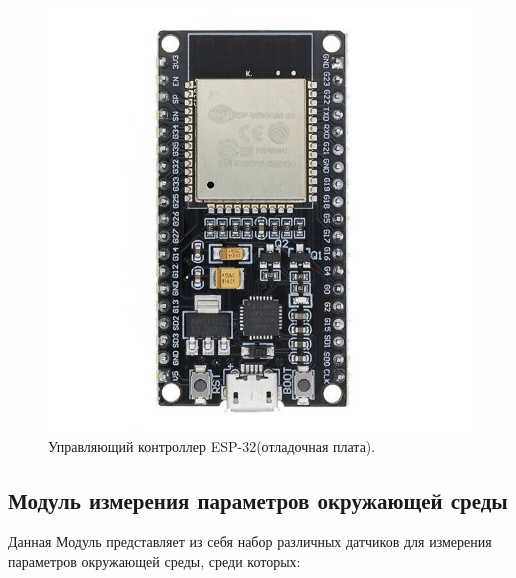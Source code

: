 \begin{figure}[H]
    \centering
    \includegraphics[scale=0.45]{images/esp.jpg}
    \caption{Управляющий контроллер ESP-32(отладочная плата).}
    \label{fig:esp}
\end{figure}

\subsection{Модуль измерения параметров окружающей среды}

Данная Модуль представляет из себя набор различных датчиков для измерения параметров окружающей среды, среди которых:

